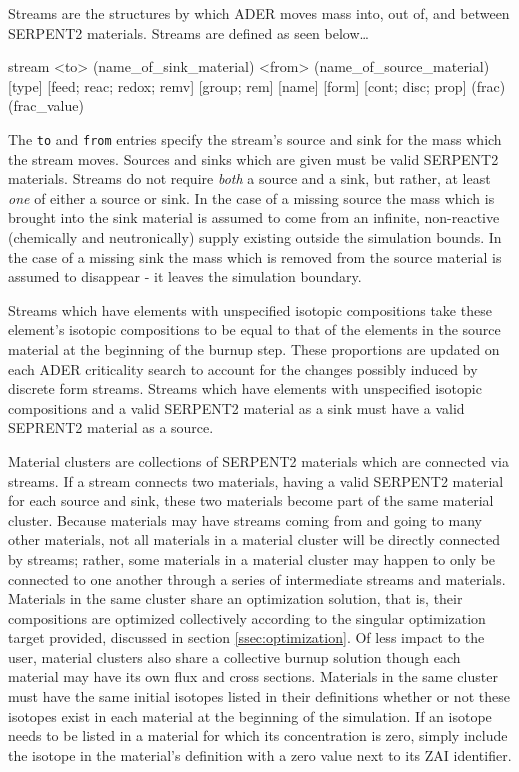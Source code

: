 Streams are the structures by which ADER moves mass into, out of, and between
SERPENT2 materials. Streams are defined as seen below\ldots

\begin{lt}
stream <to> (name_of_sink_material) <from> (name_of_source_material)
    [type] [{feed; reac; redox; remv}] [{group; rem}] [name] 
    [form] [{cont; disc; prop}] (frac) (frac_value)
\end{lt}

The \texttt{to} and \texttt{from} entries specify the stream's source and
sink for the mass which the stream moves. Sources and sinks which are given 
must be valid SERPENT2 materials. Streams do not require \textit{both} a source
and a sink, but rather, at least \textit{one} of either a source or sink. In
the case of a missing source the mass which is brought into the sink material
is assumed to 
come from an infinite, non-reactive (chemically and neutronically) supply
existing outside the simulation bounds. In the case of a missing sink the
mass which is removed from the source material is assumed to disappear - it
leaves the simulation boundary. 

Streams which have elements with unspecified isotopic compositions take these
element's isotopic compositions to be equal to that of the elements in the 
source material at the beginning of the burnup step. These proportions are
updated on each ADER criticality search to account for the changes possibly
induced by discrete form streams. Streams which have elements
with unspecified isotopic compositions and a valid SERPENT2 material as a sink
must have a valid SEPRENT2 material as a source.

Material clusters are collections of SERPENT2 materials which are connected
via streams. If a stream connects two materials, having a valid SERPENT2
material for each source and sink, these two materials become part of the same
material cluster. Because materials may have streams coming from and going to
many other materials, not all materials in a material cluster will be directly
connected by streams; rather, some materials in a material cluster may happen to only
be connected to one another through a series of intermediate streams and
materials. Materials in the same cluster share an optimization solution, that
is, their compositions are optimized collectively according to the singular
optimization target provided, discussed in section \ref{ssec:optimization}. 
Of less impact to the user, material clusters also share a collective
burnup solution though each material may have its own flux and cross sections.
Materials in the same cluster must have the same initial isotopes listed in
their definitions whether or not these isotopes exist in each material at the
beginning of the simulation. If an isotope needs to be listed in a material for
which its concentration is zero, simply include the isotope in the material's
definition with a zero value next to its ZAI identifier.

